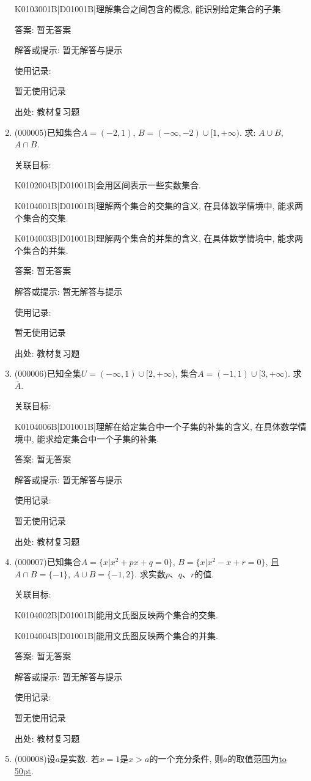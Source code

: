 \documentclass[10pt,a4paper]{article}
\newcommand{\blank}[1]{\underline{\hbox to #1pt{}}}
\begin{document}
\begin{enumerate}[1.]
K0103001B|D01001B|理解集合之间包含的概念, 能识别给定集合的子集.

答案: 暂无答案

解答或提示: 暂无解答与提示

使用记录:

暂无使用记录


出处: 教材复习题
\item { (000005)}已知集合$A=(-2, 1)$, $B=(-\infty, -2)\cup [1, +\infty)$. 求: $A\cup B$, $A\cap B$.


关联目标:

K0102004B|D01001B|会用区间表示一些实数集合.

K0104001B|D01001B|理解两个集合的交集的含义, 在具体数学情境中, 能求两个集合的交集.

K0104003B|D01001B|理解两个集合的并集的含义, 在具体数学情境中, 能求两个集合的并集.

答案: 暂无答案

解答或提示: 暂无解答与提示

使用记录:

暂无使用记录


出处: 教材复习题
\item { (000006)}已知全集$U=(-\infty, 1)\cup [2, +\infty)$, 集合$A=(-1, 1)\cup [3, +\infty)$. 求$\overline{A}$.


关联目标:

K0104006B|D01001B|理解在给定集合中一个子集的补集的含义, 在具体数学情境中, 能求给定集合中一个子集的补集.

答案: 暂无答案

解答或提示: 暂无解答与提示

使用记录:

暂无使用记录


出处: 教材复习题
\item { (000007)}已知集合$A=\{x|x^2+px+q=0\}$, $B=\{x|x^2-x+r=0\}$, 且$A\cap B=\{-1\}$, $A\cup B=\{-1, 2\}$. 求实数$p$、$q$、$r$的值.


关联目标:

K0104002B|D01001B|能用文氏图反映两个集合的交集.

K0104004B|D01001B|能用文氏图反映两个集合的并集.

答案: 暂无答案

解答或提示: 暂无解答与提示

使用记录:

暂无使用记录


出处: 教材复习题
\item { (000008)}设$a$是实数. 若$x=1$是$x>a$的一个充分条件, 则$a$的取值范围为\blank{50}.



\end{enumerate}
\end{document}
